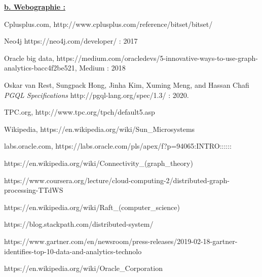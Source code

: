 \textbf{ \underline{b. Webographie :} } 
\begin{enumerate}[label={[\arabic*]}]
\item{Cplusplus.com, http://www.cplusplus.com/reference/bitset/bitset/}
\item{Neo4j https://neo4j.com/developer/ : 2017}
\item{Oracle big data, https://medium.com/oracledevs/5-innovative-ways-to-use-graph-analytics-bacc4f2be521, Medium : 2018}
\item{Oskar van Rest, Sungpack Hong, Jinha Kim, Xuming Meng, and Hassan Chafi \textit{PGQL Specifications} http://pgql-lang.org/spec/1.3/ : 2020.}
\item{TPC.org, http://www.tpc.org/tpch/default5.asp}
\item{Wikipedia, https://en.wikipedia.org/wiki/Sun\_Microsystems}
\item{labs.oracle.com, https://labs.oracle.com/pls/apex/f?p=94065:INTRO::::::}
\item{https://en.wikipedia.org/wiki/Connectivity\_(graph\_theory)}
\item{https://www.coursera.org/lecture/cloud-computing-2/distributed-graph-processing-TTdWS}
\item{https://en.wikipedia.org/wiki/Raft\_(computer\_science)}
\item{https://blog.stackpath.com/distributed-system/}
\item{https://www.gartner.com/en/newsroom/press-releases/2019-02-18-gartner-identifies-top-10-data-and-analytics-technolo}
\item{https://en.wikipedia.org/wiki/Oracle\_Corporation}
\end{enumerate}\\